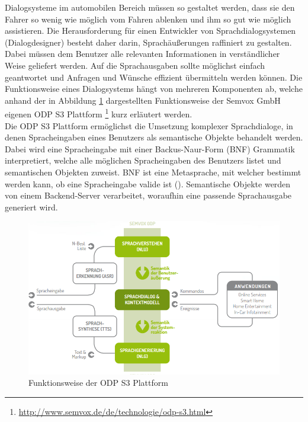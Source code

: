 \documentclass[12pt,a4paper]{scrartcl}
\begin{document}
Dialogsysteme im automobilen Bereich müssen so gestaltet werden, dass sie den Fahrer so wenig wie möglich vom Fahren ablenken und ihm so gut wie möglich assistieren. Die Herausforderung für einen Entwickler von Sprachdialogsystemen (Dialogdesigner) besteht daher darin, Sprachäußerungen raffiniert zu gestalten. Dabei müssen dem Benutzer alle relevanten Informationen in verständlicher Weise geliefert werden. Auf die Sprachausgaben sollte möglichst einfach geantwortet und Anfragen und Wünsche effizient übermitteln werden können. Die Funktionsweise eines Dialogsystems hängt von mehreren Komponenten ab, welche anhand der in Abbildung \ref{odps3} dargestellten Funktionsweise der Semvox GmbH eigenen ODP S3 Plattform \footnote{\label{foot:odps3}\url{http://www.semvox.de/de/technologie/odp-s3.html}} kurz erläutert werden. \\
Die ODP S3 Plattform ermöglichst die Umsetzung komplexer Sprachdialoge, in denen Spracheingaben eines Benutzers als semantische Objekte behandelt werden. Dabei wird eine Spracheingabe mit einer Backus-Naur-Form (BNF) Grammatik interpretiert, welche alle möglichen Spracheingaben des Benutzers listet und semantischen Objekten zuweist. BNF ist eine Metasprache, mit welcher bestimmt werden kann, ob eine Spracheingabe valide ist (\cite{BNFref}). Semantische Objekte werden von einem Backend-Server verarbeitet, woraufhin eine passende Sprachausgabe generiert wird. 
\begin{figure}[H]
\begin{center}
\includegraphics[width=12cm]{odps3.png}
\caption{Funktionsweise der ODP S3 Plattform}
\label{odps3}
\end{center}
\end{figure}
\end{document}
